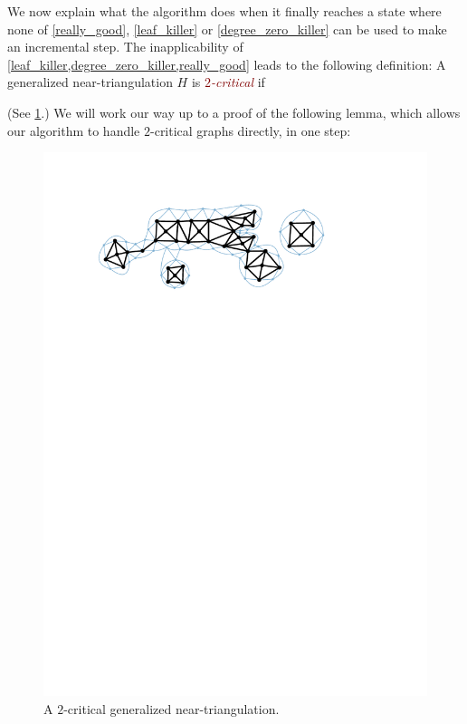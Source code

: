 \documentclass[a4paper,UKenglish,cleveref, autoref, thm-restate]{lipics-v2021}
\newcommand{\defin}[1]{\emph{\textcolor{Maroon}{#1}}}
\begin{document}
We now explain what the algorithm does when it finally reaches a state where  none of \cref{really_good}, \cref{leaf_killer} or \cref{degree_zero_killer} can be used to make an incremental step.  The inapplicability of \cref{leaf_killer,degree_zero_killer,really_good} leads to the following definition:
A generalized near-triangulation $H$ is \defin{$2$-critical} if
(See \cref{two_critical_figure}.) We will work our way up to a proof of the following lemma, which allows our algorithm to handle $2$-critical graphs directly, in one step:

\begin{figure}
  \centering
  \includegraphics[page=1]{figs/two_critical}
  \caption{A $2$-critical generalized near-triangulation.}
  \label{two_critical_figure}
\end{figure}
\end{document}
